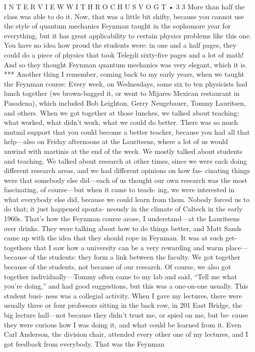 \documentclass[11pt,oneside]{article}
\begin{document}
I N T E R V I E W  W I T H  R O C H U S  V O G T • 3 3 More than half the class was able to do it. Now, that was a little bit shifty, because you cannot use the style of quantum mechanics Feynman taught in the sophomore year for everything, but it has great applicability to certain physics problems like this one. You have no idea how proud the students were: in one and a half pages, they could do a piece of physics that took Telegdi sixty-five pages and a lot of math! And so they thought Feynman quantum mechanics was very elegant, which it is. *** Another thing I remember, coming back to my early years, when we taught the Feynman course: Every week, on Wednesdays, some six to ten physicists had lunch together (we brown-bagged it, or went to Mijares Mexican restaurant in Pasadena), which included Bob Leighton, Gerry Neugebauer, Tommy Lauritsen, and others. When we got together at those lunches, we talked about teaching: what worked, what didn’t work, what we could do better. There was so much mutual support that you could become a better teacher, because you had all that help---also on Friday afternoons at the Lauritsens, where a lot of us would unwind with martinis at the end of the week. We mostly talked about students and teaching. We talked about research at other times, since we were each doing different research areas, and we had different opinions on how fas- cinating things were that somebody else did---each of us thought our own research was the most fascinating, of course---but when it came to teach- ing, we were interested in what everybody else did, because we could learn from them. Nobody forced us to do that; it just happened sponta- neously in the climate of Caltech in the early 1960s. That’s how the Feynman course arose, I understand---at the Lauritsens over drinks. They were talking about how to do things better, and Matt Sands came up with the idea that they should rope in Feynman. It was at such get-togethers that I saw how a university can be a very rewarding and warm place---because of the students: they form a link between the faculty. We got together because of the students, not because of our research. Of course, we also got together individually---Tommy often came to my lab and said, “Tell me what you’re doing,” and had good suggestions, but this was a one-on-one usually. This student busi- ness was a collegial activity. When I gave my lectures, there were usually three or four professors sitting in the back row, in 201 East Bridge, the big lecture hall---not because they didn’t trust me, or spied on me, but be- cause they were curious how I was doing it, and what could be learned from it. Even Carl Anderson, the division chair, attended every other one of my lectures, and I got feedback from everybody. That was the Feynman\par
\end{document}
